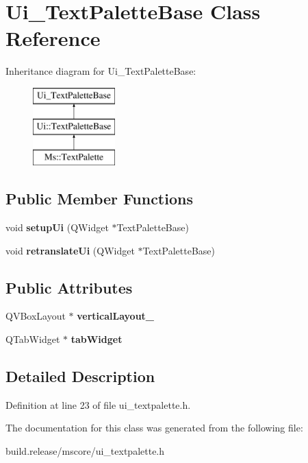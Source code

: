 \hypertarget{class_ui___text_palette_base}{}\section{Ui\+\_\+\+Text\+Palette\+Base Class Reference}
\label{class_ui___text_palette_base}
Inheritance diagram for Ui\+\_\+\+Text\+Palette\+Base\+:\begin{figure}[H]
\begin{center}
\leavevmode
\includegraphics[height=3.000000cm]{class_ui___text_palette_base}
\end{center}
\end{figure}
\subsection*{Public Member Functions}
\begin{DoxyCompactItemize}
\item 
\mbox{\label{class_ui___text_palette_base_a574d508e2683dfbef9af2a07128cad66}} 
void {\bfseries setup\+Ui} (Q\+Widget $\ast$Text\+Palette\+Base)
\item 
\mbox{\label{class_ui___text_palette_base_a739ef97188f3b2db49311c164b08a026}} 
void {\bfseries retranslate\+Ui} (Q\+Widget $\ast$Text\+Palette\+Base)
\end{DoxyCompactItemize}
\subsection*{Public Attributes}
\begin{DoxyCompactItemize}
\item 
\mbox{\label{class_ui___text_palette_base_a1478d35b53118c075abdc28f0f492031}} 
Q\+V\+Box\+Layout $\ast$ {\bfseries vertical\+Layout\+\_}
\item 
\mbox{\label{class_ui___text_palette_base_a94900fec0f8faf1b2d4965e16651f1de}} 
Q\+Tab\+Widget $\ast$ {\bfseries tab\+Widget}
\end{DoxyCompactItemize}


\subsection{Detailed Description}


Definition at line 23 of file ui\+\_\+textpalette.\+h.



The documentation for this class was generated from the following file\+:\begin{DoxyCompactItemize}
\item 
build.\+release/mscore/ui\+\_\+textpalette.\+h\end{DoxyCompactItemize}
